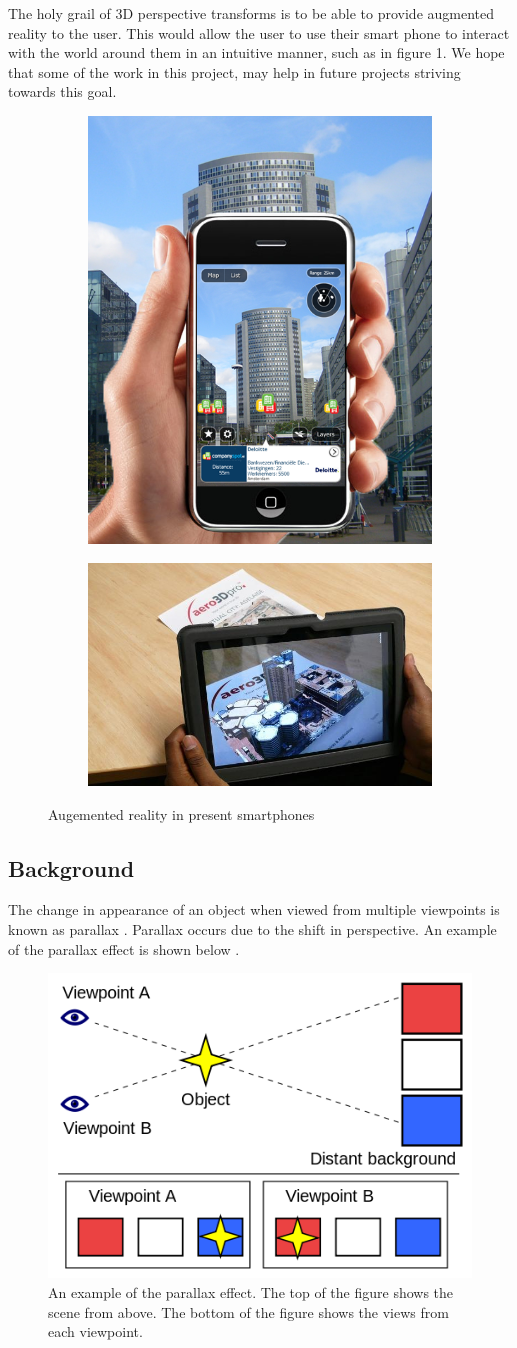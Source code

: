 \documentclass[12pt,twocolumn,letterpaper]{article}
\begin{document}
The holy grail of 3D perspective transforms is to be able to provide augmented reality to the user.  This would allow the user to use their smart phone to interact with the world around them in an intuitive manner, such as in figure 1.  We hope that some of the work in this project, may help in future projects striving towards this goal.


\begin{figure}[!htbp]
\centering
\begin{subfigure}{0.22\textwidth}
\includegraphics[height=35 mm]{AR_now}
\end{subfigure}
\begin{subfigure}{0.22\textwidth}
\includegraphics[height=25 mm]{AR_now1}
\end{subfigure}
\caption{Augemented reality in present smartphones}
\label{fig:arnow}
\end{figure}

\subsection{Background}

The change in appearance of an object when viewed from multiple viewpoints is known as parallax \cite{Szeliski}.  Parallax occurs due to the shift in perspective.  An example of the parallax effect is shown below \cite{Wikipedia}.

\begin{figure}[!htbp]
\centering
\includegraphics[height=30 mm]{parallax.png}
\caption{An example of the parallax effect.  The top of the figure shows the scene from above.  The bottom of the figure shows the views from each viewpoint.}
\end{figure}
\end{document}
